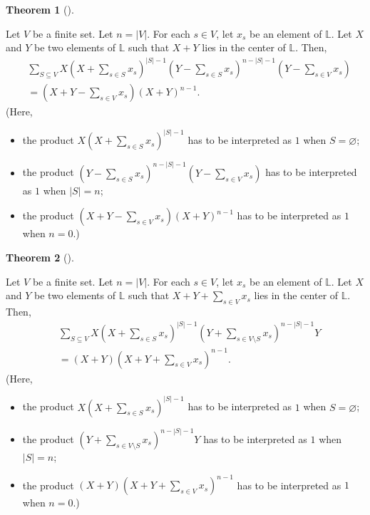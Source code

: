 \documentclass[numbers=enddot,12pt,final,onecolumn,notitlepage]{scrartcl}%
\theoremstyle{definition}
\newtheorem{theo}{Theorem}[section]
\newenvironment{theorem}[1][]
{\begin{theo}[#1]\begin{leftbar}}
{\end{leftbar}\end{theo}}
\let\sumnonlimits\sum
\renewcommand{\sum}{\sumnonlimits\limits}
\begin{document}
\begin{theorem}
\label{thm.4}Let $V$ be a finite set. Let $n=\left\vert V\right\vert $. For
each $s\in V$, let $x_{s}$ be an element of $\mathbb{L}$. Let $X$ and $Y$ be
two elements of $\mathbb{L}$ such that $X+Y$ lies in the center of
$\mathbb{L}$. Then,%
\begin{align*}
&  \sum_{S\subseteq V}X\left(  X+\sum_{s\in S}x_{s}\right)  ^{\left\vert
S\right\vert -1}\left(  Y-\sum_{s\in S}x_{s}\right)  ^{n-\left\vert
S\right\vert -1}\left(  Y-\sum_{s\in V}x_{s}\right) \\
&  =\left(  X+Y-\sum_{s\in V}x_{s}\right)  \left(  X+Y\right)  ^{n-1}.
\end{align*}
(Here,

\begin{itemize}
\item the product $X\left(  X+\sum_{s\in S}x_{s}\right)  ^{\left\vert
S\right\vert -1}$ has to be interpreted as $1$ when $S=\varnothing$;

\item the product $\left(  Y-\sum_{s\in S}x_{s}\right)  ^{n-\left\vert
S\right\vert -1}\left(  Y-\sum_{s\in V}x_{s}\right)  $ has to be interpreted
as $1$ when $\left\vert S\right\vert =n$;

\item the product $\left(  X+Y-\sum_{s\in V}x_{s}\right)  \left(  X+Y\right)
^{n-1}$ has to be interpreted as $1$ when $n=0$.)
\end{itemize}
\end{theorem}

\begin{theorem}
\label{thm.5}Let $V$ be a finite set. Let $n=\left\vert V\right\vert $. For
each $s\in V$, let $x_{s}$ be an element of $\mathbb{L}$. Let $X$ and $Y$ be
two elements of $\mathbb{L}$ such that $X+Y+\sum_{s\in V}x_{s}$ lies in the
center of $\mathbb{L}$. Then,%
\begin{align*}
&  \sum_{S\subseteq V}X\left(  X+\sum_{s\in S}x_{s}\right)  ^{\left\vert
S\right\vert -1}\left(  Y+\sum_{s\in V\setminus S}x_{s}\right)  ^{n-\left\vert
S\right\vert -1}Y\\
&  =\left(  X+Y\right)  \left(  X+Y+\sum_{s\in V}x_{s}\right)  ^{n-1}.
\end{align*}
(Here,

\begin{itemize}
\item the product $X\left(  X+\sum_{s\in S}x_{s}\right)  ^{\left\vert
S\right\vert -1}$ has to be interpreted as $1$ when $S=\varnothing$;

\item the product $\left(  Y+\sum_{s\in V\setminus S}x_{s}\right)
^{n-\left\vert S\right\vert -1}Y$ has to be interpreted as $1$ when
$\left\vert S\right\vert =n$;

\item the product $\left(  X+Y\right)  \left(  X+Y+\sum_{s\in V}x_{s}\right)
^{n-1}$ has to be interpreted as $1$ when $n=0$.)
\end{itemize}
\end{theorem}
\end{document}
